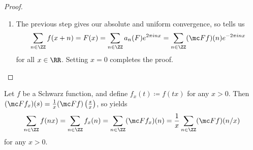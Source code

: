 \documentclass[../notes.tex]{subfiles}
\begin{document}
\begin{proof}
\begin{enumerate}
		\item The previous step gives our absolute and uniform convergence, so  tells us
		\[\sum_{n\in\ZZ}f(x+n)=F(x)=\sum_{n\in\ZZ}a_n(F)e^{2\pi inx}=\sum_{n\in\ZZ}(\mc Ff)(n)e^{-2\pi inx}\]
		for all $x\in\RR$. Setting $x=0$ completes the proof.
		\qedhere
	\end{enumerate}
\end{proof}
\begin{example} \label{ex:use-ps}
	Let $f$ be a Schwarz function, and define $f_x(t)\coloneqq f(tx)$ for any $x>0$. Then $(\mc Ff_x)(s)=\frac1x(\mc Ff)\left(\frac sx\right)$, so  yields
	\[\sum_{n\in\ZZ}f(nx)=\sum_{n\in\ZZ}f_x(n)=\sum_{n\in\ZZ}(\mc Ff_x)(n)=\frac1x\sum_{n\in\ZZ}(\mc Ff)(n/x)\]
	for any $x>0$.
\end{example}
\end{document}
